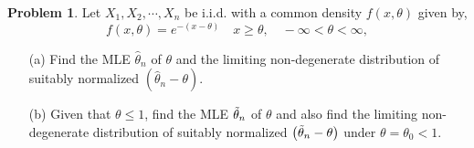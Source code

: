\documentclass[12pt]{article}
\theoremstyle{definition}
\newtheorem*{prb}{Problem}
\newenvironment{problem}{\begin{tcolorbox}[colback=blue!5!white,colframe=blue!75!black, parbox = true] \begin{prb}  }{\end{prb}\end{tcolorbox} }
\numberwithin{equation}{section}
\begin{document}
\begin{problem}
Let $X_1,X_2,\cdots,X_n$ be i.i.d. with a common density $f(x,\theta)$ given by,
$$f(x,\theta) = e^{-(x-\theta)}\quad x\geq \theta, \quad -\infty<\theta<\infty,$$
\begin{itemize}
    \item[(a)] Find the MLE $\hat{\theta}_n$ of $\theta$ and the limiting non-degenerate distribution of suitably normalized $\left(\hat{\theta}_n-\theta\right)$.
    \item[(b)] Given that $\theta\leq 1$, find the MLE $\Tilde{\theta}_n$ of $\theta$ and also find the limiting non-degenerate distribution of suitably normalized $\left(\Tilde{\theta}_n-\theta\right)$ under $\theta = \theta_0 < 1$. 
\end{itemize}
\end{problem}
\end{document}
